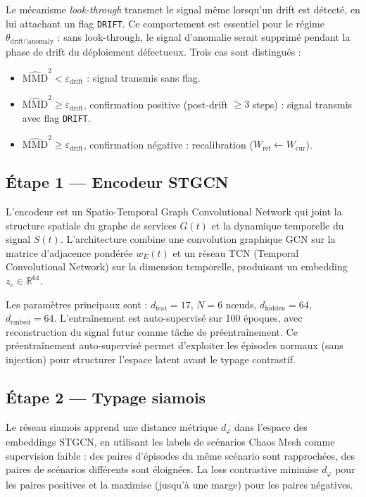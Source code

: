 Le mécanisme \emph{look-through} \cite{hinder2024} transmet le signal même lorsqu'un drift
est détecté, en lui attachant un flag \texttt{DRIFT}. Ce comportement est essentiel pour le
régime $\theta_{\text{drift} \cap \text{anomaly}}$ : sans look-through, le signal d'anomalie
serait supprimé pendant la phase de drift du déploiement défectueux.
Trois cas sont distingués :
\begin{itemize}
  \item $\widehat{\text{MMD}}^2 < \varepsilon_\text{drift}$ : signal transmis sans flag.
  \item $\widehat{\text{MMD}}^2 \geq \varepsilon_\text{drift}$,
    confirmation positive (post-drift $\geq 3$ steps) : signal transmis avec flag \texttt{DRIFT}.
  \item $\widehat{\text{MMD}}^2 \geq \varepsilon_\text{drift}$,
    confirmation négative : recalibration ($W_\text{ref} \leftarrow W_\text{cur}$).
\end{itemize}

\subsection{Étape 1 --- Encodeur STGCN}
\label{sec:encoder}

L'encodeur est un Spatio-Temporal Graph Convolutional Network \cite{yu2018} qui joint
la structure spatiale du graphe de services $G(t)$ et la dynamique temporelle
du signal $S(t)$. L'architecture combine une convolution graphique GCN sur la matrice
d'adjacence pondérée $w_E(t)$ et un réseau TCN (Temporal Convolutional Network)
sur la dimension temporelle, produisant un embedding $z_e \in \mathbb{R}^{64}$.

Les paramètres principaux sont : $d_\text{feat} = 17$, $N = 6$ nœuds,
$d_\text{hidden} = 64$, $d_\text{embed} = 64$. L'entraînement est auto-supervisé sur
100 époques, avec reconstruction du signal futur comme tâche de préentraînement.
Ce préentraînement auto-supervisé permet d'exploiter les épisodes normaux
(sans injection) pour structurer l'espace latent avant le typage contrastif.

\subsection{Étape 2 --- Typage siamois}
\label{sec:typing}

Le réseau siamois apprend une distance métrique $d_\varphi$ dans l'espace des embeddings
STGCN, en utilisant les labels de scénarios Chaos Mesh comme supervision faible :
des paires d'épisodes du même scénario sont rapprochées, des paires de scénarios différents
sont éloignées. La loss contrastive minimise $d_\varphi$ pour les paires positives
et la maximise (jusqu'à une marge) pour les paires négatives.

